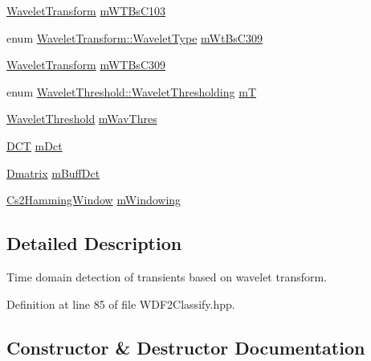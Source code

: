 \begin{DoxyCompactItemize}
\item 
\hyperlink{classtsa_1_1_wavelet_transform}{Wavelet\+Transform} \hyperlink{classtsa_1_1_w_d_f2_classify_a6727f3e9350844a3f58ecb547c5ee43e}{m\+W\+T\+Bs\+C103}
\item 
enum \hyperlink{classtsa_1_1_wavelet_transform_a5a529de70e0004333fcf23b9cca88ce7}{Wavelet\+Transform\+::\+Wavelet\+Type} \hyperlink{classtsa_1_1_w_d_f2_classify_af2358ebcb57c3f4403aa18e42749cf9b}{m\+Wt\+Bs\+C309}
\item 
\hyperlink{classtsa_1_1_wavelet_transform}{Wavelet\+Transform} \hyperlink{classtsa_1_1_w_d_f2_classify_a8edb800d43b0ca29226cce44e71e0b29}{m\+W\+T\+Bs\+C309}
\item 
enum \hyperlink{classtsa_1_1_wavelet_threshold_a50c42c95dae960986a985157ca038fae}{Wavelet\+Threshold\+::\+Wavelet\+Thresholding} \hyperlink{classtsa_1_1_w_d_f2_classify_a58dda0f0890a77d38d1850bf8fc52e47}{mT}
\item 
\hyperlink{classtsa_1_1_wavelet_threshold}{Wavelet\+Threshold} \hyperlink{classtsa_1_1_w_d_f2_classify_a9ad2280ce3bf48639f2a2a8dfea91d75}{m\+Wav\+Thres}
\item 
\hyperlink{classtsa_1_1_d_c_t}{D\+CT} \hyperlink{classtsa_1_1_w_d_f2_classify_af4b2e7e38686958add4de8e6d9ad00f0}{m\+Dct}
\item 
\hyperlink{namespacetsa_ad260cd21c1891c4ed391fe788569aba4}{Dmatrix} \hyperlink{classtsa_1_1_w_d_f2_classify_a2a01ab9900e2ebecce3102e2a3f108b5}{m\+Buff\+Dct}
\item 
\hyperlink{classtsa_1_1_cs2_hamming_window}{Cs2\+Hamming\+Window} \hyperlink{classtsa_1_1_w_d_f2_classify_a3bc01eda0b34064bfc9157a1ff708391}{m\+Windowing}
\end{DoxyCompactItemize}


\subsection{Detailed Description}
Time domain detection of transients based on wavelet transform. 

Definition at line 85 of file W\+D\+F2\+Classify.\+hpp.



\subsection{Constructor \& Destructor Documentation}
\mbox{\label{classtsa_1_1_w_d_f2_classify_a1149d3b3364891a001ed37a78a085932}} 
